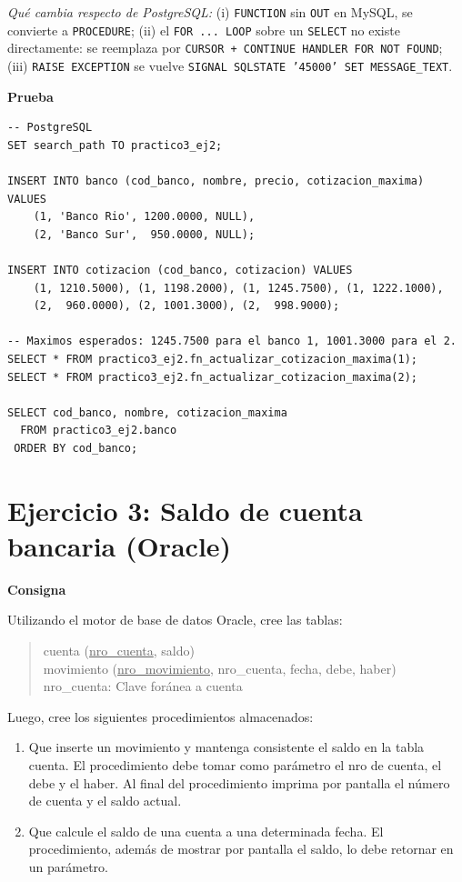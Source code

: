 \documentclass[11pt,a4paper]{article}
\newcommand{\itemcabecera}[1]{\noindent\textbf{#1}\par\medskip}
\newcommand{\bloqueConsigna}{\itemcabecera{Consigna}}
\newcommand{\bloquePrueba}{\itemcabecera{Prueba}}
\begin{document}
\textit{Qué cambia respecto de PostgreSQL:} (i) \texttt{FUNCTION} sin \texttt{OUT} en MySQL, se convierte a \texttt{PROCEDURE}; (ii) el \texttt{FOR ... LOOP} sobre un \texttt{SELECT} no existe directamente: se reemplaza por \texttt{CURSOR + CONTINUE HANDLER FOR NOT FOUND}; (iii) \texttt{RAISE EXCEPTION} se vuelve \texttt{SIGNAL SQLSTATE '45000' SET MESSAGE\_TEXT}.

\bloquePrueba

\begin{lstlisting}
-- PostgreSQL
SET search_path TO practico3_ej2;

INSERT INTO banco (cod_banco, nombre, precio, cotizacion_maxima) VALUES
    (1, 'Banco Rio', 1200.0000, NULL),
    (2, 'Banco Sur',  950.0000, NULL);

INSERT INTO cotizacion (cod_banco, cotizacion) VALUES
    (1, 1210.5000), (1, 1198.2000), (1, 1245.7500), (1, 1222.1000),
    (2,  960.0000), (2, 1001.3000), (2,  998.9000);

-- Maximos esperados: 1245.7500 para el banco 1, 1001.3000 para el 2.
SELECT * FROM practico3_ej2.fn_actualizar_cotizacion_maxima(1);
SELECT * FROM practico3_ej2.fn_actualizar_cotizacion_maxima(2);

SELECT cod_banco, nombre, cotizacion_maxima
  FROM practico3_ej2.banco
 ORDER BY cod_banco;
\end{lstlisting}

\section{Ejercicio 3: Saldo de cuenta bancaria (Oracle)}

\bloqueConsigna

Utilizando el motor de base de datos Oracle, cree las tablas:

\begin{quote}\ttfamily\small
cuenta (\underline{nro\_cuenta}, saldo)\\
movimiento (\underline{nro\_movimiento}, nro\_cuenta, fecha, debe, haber)\\
\hspace*{1em} nro\_cuenta: Clave foránea a cuenta
\end{quote}

Luego, cree los siguientes procedimientos almacenados:

\begin{enumerate}[label=\alph*),leftmargin=*]
    \item Que inserte un movimiento y mantenga consistente el saldo en la tabla cuenta. El procedimiento debe tomar como parámetro el nro de cuenta, el debe y el haber. Al final del procedimiento imprima por pantalla el número de cuenta y el saldo actual.
    \item Que calcule el saldo de una cuenta a una determinada fecha. El procedimiento, además de mostrar por pantalla el saldo, lo debe retornar en un parámetro.
\end{enumerate}
\end{document}
